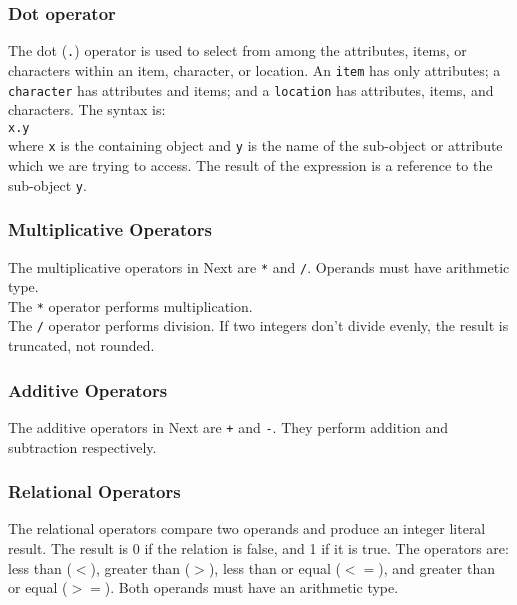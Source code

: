 \documentclass[12pt]{article}
\begin{document}
\subsubsection{Dot operator}
The dot (\texttt{.}) operator is used to select from among the attributes, items, or characters within an item, character, or location.  An \texttt{item} has only attributes; a \texttt{character} has attributes and items; and a \texttt{location} has attributes, items, and characters.  The syntax is: \\

\texttt{x.y} \\

\noindent where \texttt{x} is the containing object and \texttt{y} is the name of the sub-object or attribute which we are trying to access.  The result of the expression is a reference to the sub-object \texttt{y}.

\subsubsection{Multiplicative Operators}
The multiplicative operators in Next are \texttt{*} and \texttt{/}.  Operands must have arithmetic type. \\

\noindent The \texttt{*} operator performs multiplication. \\

\noindent The \texttt{/} operator performs division.  If two integers don't divide evenly, the result is truncated, not rounded.

\subsubsection{Additive Operators}
The additive operators in Next are \texttt{+} and \texttt{-}.  They perform addition and subtraction respectively.

\subsubsection{Relational Operators}
The relational operators compare two operands and produce an integer literal result.  The result is 0 if the relation is false, and 1 if it is true.  The operators are: less than (\texttt{$<$}), greater than (\texttt{$>$}), less than or equal (\texttt{$<=$}), and greater than or equal (\texttt{$>=$}).  Both operands must have an arithmetic type. \\
\end{document}
